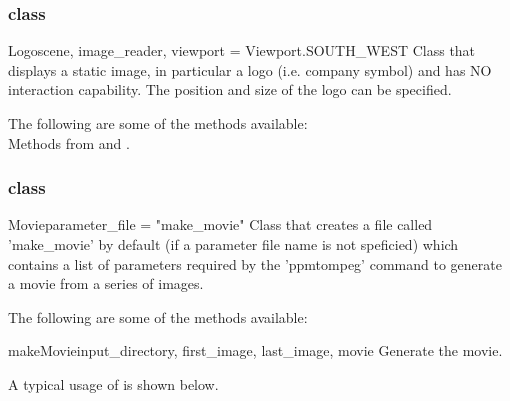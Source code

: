 \subsubsection{\Logo class}

\begin{classdesc}{Logo}{scene, image_reader, viewport = Viewport.SOUTH_WEST}
Class that displays a static image, in particular a logo
(i.e. company symbol) and has NO interaction capability. The position and size
of the logo can be specified.
\end{classdesc}

The following are some of the methods available:\\
Methods from \ImageReslice and \ActorTwoD.

\subsubsection{\Movie class}

\begin{classdesc}{Movie}{parameter_file = "make_movie"}
Class that creates a file called 'make_movie' by default (if a parameter
file name is not speficied) which contains a list of parameters required
by the 'ppmtompeg' command to generate a movie from a series of images.
\end{classdesc}

The following are some of the methods available:\\
\begin{methoddesc}[Movie]{makeMovie}{input_directory, first_image, last_image,
movie}
Generate the movie.
\end{methoddesc}

A typical usage of \Image is shown below.

